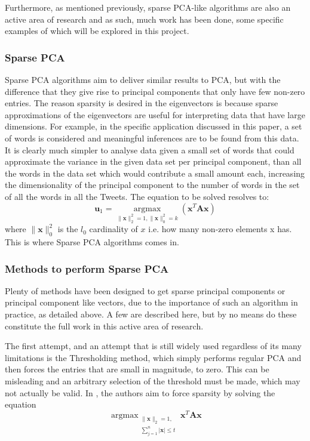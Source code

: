 \documentclass[11pt,a4paper]{article}
\begin{document}
Furthermore, as mentioned previously, sparse PCA-like algorithms are also an active area of research and as such, much work has been done, some specific examples of which will be explored in this project.

\subsubsection{Sparse PCA}

Sparse PCA algorithms aim to deliver similar results to PCA, but with the difference that they give rise to principal components that only have few non-zero entries. The reason sparsity is desired in the eigenvectors is because sparse approximations of the eigenvectors are useful for interpreting data that have large dimensions. For example, in the specific application discussed in this paper, a set of words is considered and meaningful inferences are to be found from this data. It is clearly much simpler to analyse data given a small set of words that could approximate the variance in the given data set per principal component, than all the words in the data set which would contribute a small amount each, increasing the dimensionality of the principal component to the number of words in the set of all the words in all the Tweets. The equation to be solved resolves to:
\begin{equation}
\mathbf{u}_1 = \underset{\|\mathbf{x}\|_2^2 = 1, \|\mathbf{x}\|_0^2 = k}{\operatorname{argmax}}\left( \mathbf{x}^T\mathbf{A}\mathbf{x}\right)
\end{equation}
where $\|\mathbf{x}\|_0^2$ is the $l_0$ cardinality of $x$ i.e. how many non-zero elements x has. This is where Sparse PCA algorithms comes in. 

\subsubsection{Methods to perform Sparse PCA}
Plenty of methods have been designed to get sparse principal components or principal component like vectors, due to the importance of such an algorithm in practice, as detailed above. A few are described here, but by no means do these constitute the full work in this active area of research.
 
The first attempt, and an attempt that is still widely used regardless of its many limitations is the Thresholding method, which simply performs regular PCA and then forces the entries that are small in magnitude, to zero. This can be misleading and an arbitrary selection of the threshold must be made, which may not actually be valid. In \cite{scotlass}, the authors aim to force sparsity by solving the equation
\begin{equation*}
\operatorname{argmax}_{\substack{\|\mathbf{x}\|_2 = 1, \\ \sum_{j=1}^n|\mathbf{x}| \leq t}}\mathbf{x}^T\mathbf{A}\mathbf{x}
\end{equation*}
 
\end{document}
